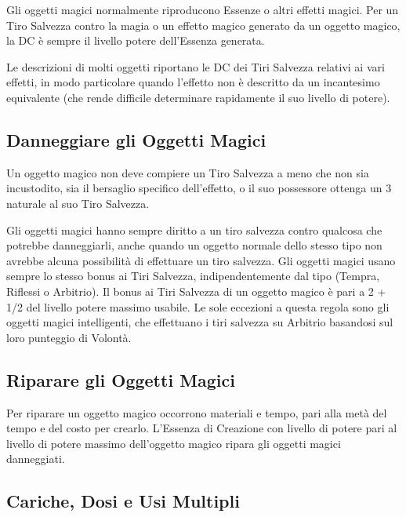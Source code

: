 \documentclass[a4paper,11pt,twoside,openany]{book}
\begin{document}
Gli oggetti magici normalmente riproducono Essenze o altri effetti magici. Per un Tiro Salvezza contro la magia o un effetto magico generato da un oggetto magico, la DC è sempre il livello potere dell'Essenza generata.

Le descrizioni di molti oggetti riportano le DC dei Tiri Salvezza relativi ai vari effetti, in modo particolare quando l'effetto non è descritto da un incantesimo equivalente (che rende difficile determinare rapidamente il suo livello di potere).


\subsection{Danneggiare gli Oggetti Magici}

\label{danneggiare-gli-oggetti-magici}

Un oggetto magico non deve compiere un Tiro Salvezza a meno che non sia incustodito, sia il bersaglio specifico dell'effetto, o il suo possessore ottenga un 3 naturale al suo Tiro Salvezza.

Gli oggetti magici hanno sempre diritto a un tiro salvezza contro qualcosa che potrebbe danneggiarli, anche quando un oggetto normale dello stesso tipo non avrebbe alcuna possibilità di effettuare un tiro salvezza. Gli oggetti magici usano sempre lo stesso bonus ai Tiri Salvezza, indipendentemente dal tipo (Tempra, Riflessi o Arbitrio). Il bonus ai Tiri Salvezza di un oggetto magico è pari a 2 + 1/2 del livello potere massimo usabile. Le sole eccezioni a questa regola sono gli oggetti magici intelligenti, che effettuano i tiri salvezza su Arbitrio basandosi sul loro punteggio di Volontà.


\subsection{Riparare gli Oggetti Magici}
\label{riparare-gli-oggetti-magici}

Per riparare un oggetto magico occorrono materiali e tempo, pari alla metà del tempo e del costo per crearlo. L'Essenza di Creazione con livello di potere pari al livello di potere massimo dell'oggetto magico ripara gli oggetti magici danneggiati.


\subsection{Cariche, Dosi e Usi Multipli}
\end{document}
